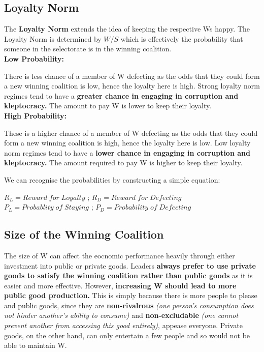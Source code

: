 \documentclass[12pt, letterpaper]{article}
\begin{document}
\subsection{Loyalty Norm}
The \textbf{Loyalty Norm} extends the idea of keeping the respective Ws happy. The Loyalty Norm is determined by $W/S$ which is effectively the probability that someone in the selectorate is in the winning coalition. \\

\textbf{Low Probability:}

There is less chance of a member of W defecting as the odds that they could form a new winning coalition is low, hence the loyalty here is high. Strong loyalty norm regimes tend to have a \textbf{greater chance in engaging in corruption and kleptocracy.} The amount to pay W is lower to keep their loyalty. \\

\textbf{High Probability:}

These is a higher chance of a member of W defecting as the odds that they could form a new winning coalition is high, hence the loyalty here is low. Low loyalty norm regimes tend to have a \textbf{lower chance in engaging in corruption and kleptocracy.} The amount required to pay W is higher to keep their loyalty. 

\begin{center}

We can recognise the probabilities by constructing a simple equation:

$R_L = Reward\;for\;Loyalty$ ;
$R_D = Reward\;for\;Defecting$ \\
$P_L = Probablity\;of\;Staying$ ;
$P_D = Probability\;of\;Defecting$ \\

\end{center}

\subsection{Size of the Winning Coalition}
The size of W can affect the eocnomic performance heavily through either investment into public or private goods. Leaders \textbf{always prefer to use private goods to satisfy the winning coalition rather than public goods} as it is easier and more effective. However, \textbf{increasing W should lead to more public good production.} This is simply because there is more people to please and public goods, since they are \textbf{non-rivalrous} \textit{(one person's consumption does not hinder another's ability to consume)} and \textbf{non-excludable} \textit{(one cannot prevent another from accessing this good entirely)}, appease everyone. Private goods, on the other hand, can only entertain a few people and so would not be able to maintain W.
\end{document}
